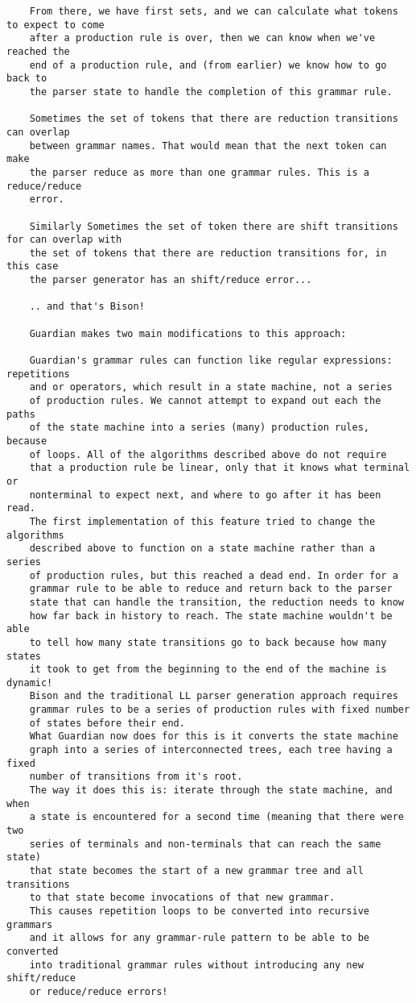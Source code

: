 {\begin{verbatim}
	From there, we have first sets, and we can calculate what tokens to expect to come
	after a production rule is over, then we can know when we've reached the
	end of a production rule, and (from earlier) we know how to go back to
	the parser state to handle the completion of this grammar rule.

	Sometimes the set of tokens that there are reduction transitions can overlap
	between grammar names. That would mean that the next token can make
	the parser reduce as more than one grammar rules. This is a reduce/reduce
	error.

	Similarly Sometimes the set of token there are shift transitions for can overlap with
	the set of tokens that there are reduction transitions for, in this case
	the parser generator has an shift/reduce error...

	.. and that's Bison!

	Guardian makes two main modifications to this approach:

	Guardian's grammar rules can function like regular expressions: repetitions
	and or operators, which result in a state machine, not a series
	of production rules. We cannot attempt to expand out each the paths
	of the state machine into a series (many) production rules, because
	of loops. All of the algorithms described above do not require
	that a production rule be linear, only that it knows what terminal or
	nonterminal to expect next, and where to go after it has been read.
	The first implementation of this feature tried to change the algorithms
	described above to function on a state machine rather than a series
	of production rules, but this reached a dead end. In order for a
	grammar rule to be able to reduce and return back to the parser
	state that can handle the transition, the reduction needs to know
	how far back in history to reach. The state machine wouldn't be able
	to tell how many state transitions go to back because how many states
	it took to get from the beginning to the end of the machine is dynamic!
	Bison and the traditional LL parser generation approach requires
	grammar rules to be a series of production rules with fixed number
	of states before their end.
	What Guardian now does for this is it converts the state machine
	graph into a series of interconnected trees, each tree having a fixed
	number of transitions from it's root.
	The way it does this is: iterate through the state machine, and when
	a state is encountered for a second time (meaning that there were two
	series of terminals and non-terminals that can reach the same state)
	that state becomes the start of a new grammar tree and all transitions
	to that state become invocations of that new grammar.
	This causes repetition loops to be converted into recursive grammars
	and it allows for any grammar-rule pattern to be able to be converted
	into traditional grammar rules without introducing any new shift/reduce
	or reduce/reduce errors!


\end{verbatim}}
